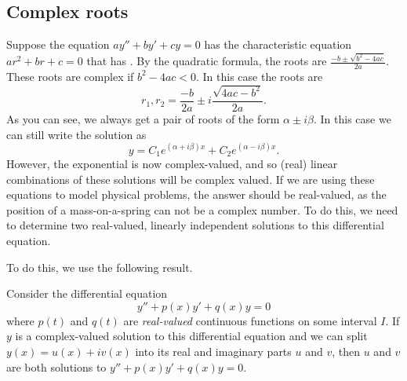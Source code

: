 \documentclass{ximera}
\begin{document}
\subsection{Complex roots}

Suppose the equation $ay'' + by' + cy = 0$ has the  characteristic equation $a r^2 + b r + c = 0$ that has . By the quadratic formula, the roots are $\frac{-b \pm \sqrt{b^2 - 4ac}}{2a}$. These roots are complex if $b^2 - 4ac < 0$.  In this case the roots are
\begin{equation*}
    r_1, r_2 = \frac{-b}{2a} \pm i\frac{\sqrt{4ac - b^2}}{2a} .
\end{equation*}
As you can see, we always get a pair of roots of the form $\alpha \pm i \beta$.  In this case we can still write the solution as
\begin{equation*}
    y = C_1 e^{(\alpha+i\beta)x} + C_2 e^{(\alpha-i\beta)x} .
\end{equation*}
However, the exponential is now complex-valued, and so (real) linear combinations of these solutions will be complex valued. If we are using these equations to model physical problems, the answer should be real-valued, as the position of a mass-on-a-spring can not be a complex number. To do this, we need to determine two real-valued, linearly independent solutions to this differential equation.

To do this, we use the following result.

\begin{theorem}{}
    Consider the differential equation 
    \begin{equation*}
        y'' + p(x)y' + q(x)y = 0
    \end{equation*}
    where $p(t)$ and $q(t)$ are \emph{real-valued} continuous functions on some interval $I$. If $y$ is a complex-valued solution to this differential equation and we can split $y(x) = u(x) + i v(x)$ into its real and imaginary parts $u$ and $v$, then $u$ and $v$ are both solutions to $y'' + p(x)y' + q(x)y = 0$.
\end{theorem} 
\end{document}
